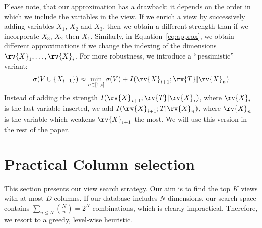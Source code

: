 Please note, that our approximation has a drawback: it depends on the order in which we include
the variables in the view. If we enrich a view by successively adding variables
$X_1$, $X_2$ and $X_3$, then we obtain a different strength than if we
incorporate $X_3$, $X_2$ then $X_1$. Similarly, in Equation~\ref{eq:approx}, we
obtain different approximations if we change the indexing of the dimensions
$\rv{X}_1, \ldots, \rv{X}_i$.  For more robustness, we introduce a
``pessimistic'' variant:
\begin{equation}\label{eq:robustapprox}
    \sigma(V \cup \{X_{i+1}\}) 
    \approx \min_{n \in [1, i]} \sigma(V) + I(\rv{X}_{i+1} ; \rv{T} | \rv{X}_{n})
\end{equation}
Instead of adding the strength $I(\rv{X}_{i+1}; \rv{T} | \rv{X}_i)$, where
$\rv{X}_i$ is the last variable inserted, we add $I(\rv{X}_{i+1}; T |
\rv{X}_n)$, where $\rv{X}_n$ is the variable which weakens $\rv{X}_{i+1}$ the
most. We will use this version in the rest of the paper.







\section{Practical Column selection}
\label{sec:column}
This section presents our view search strategy. Our aim is to find the top $K$
views with at most $D$ columns. If our database includes $N$ dimensions, our
search space contains $\sum_{n \leq N} \binom{N}{n} = 2^N$ combinations, which
is clearly impractical. Therefore, we resort to a  greedy, level-wise
heuristic.


